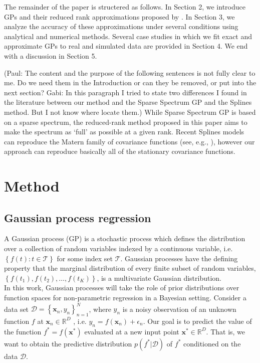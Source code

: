 \documentclass[]{interact}
\theoremstyle{plain}%
\theoremstyle{definition}
\theoremstyle{remark}
\begin{document}
The remainder of the paper is structered as follows. In Section 2, we introduce GPs and their reduced rank approximations proposed by \cite{solin2018hilbert}. In Section 3, we analyze the accuracy of these approximations under several conditions using analytical and numerical methods. Several case studies in which we fit
exact and approximate GPs to real and simulated data are provided in Section 4. We end with a discussion in Section 5.

(Paul: The content and the purpose of the following sentences is not fully clear to me. Do we need them in the Introduction or can they be removed, or put into the next section? Gabi: In this paragraph I tried to state two differences I found in the literature between our method and the Sparse Spectrum GP and the Splines method. But I not know where locate them.) While Sparse Spectrum GP is based on a sparse spectrum, the reduced-rank method proposed in this paper aims to make the spectrum as ‘full’ as possible at a given rank. Recent Splines models can reproduce the Matern family of covariance functions (see, e.g., \cite{wood2003thin}), however our approach can reproduce basically all of the stationary covariance functions.

\vspace{3mm}
\section{Method}\label{sec:bf_method}

\subsection{Gaussian process regression}

A Gaussian process (GP) is a stochastic process which defines the distribution over a collection of random variables indexed by a continuous variable, i.e. $\left\lbrace f(t): t \in \mathcal{T}\right\rbrace$ for some index set $\mathcal{T}$. Gaussian processes have the defining property that the marginal distribution of every finite subset of random variables, $\left\lbrace f(t_1), f(t_2), \hdots, f(t_K) \right\rbrace$, is a multivariate Gaussian distribution.\\

In this work, Gaussian processes will take the role of prior distributions over function spaces for non-parametric regression in a Bayesian setting. 
Consider a data set $\mathcal{D} = \left\lbrace \mathbf{x}_n, y_n \right\rbrace_{n=1}^N$, where $y_n$ is a noisy observation of an unknown function $f$ at $\mathbf{x}_n \in \mathbb{R}^D$ , i.e. $y_n = f(\mathbf{x}_n) + \epsilon_n$. Our goal is to predict the value of the function $f^*=f(\mathbf{x}^*)$ evaluated at a new input point $\mathbf{x}^* \in \mathbb{R}^D$. That is, we want to obtain the predictive distribution $p(f^*|\mathcal{D})$ of $f^*$ conditioned on the data $\mathcal{D}$.\\
\end{document}
